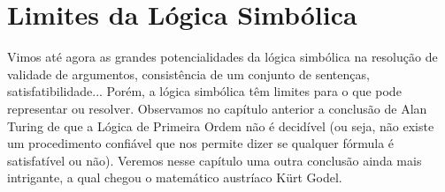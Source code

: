 \chapter{Limites da Lógica Simbólica}

Vimos até agora as grandes potencialidades da lógica simbólica na resolução de validade de argumentos, consistência de um conjunto de sentenças, satisfatibilidade... Porém, a lógica simbólica têm limites para o que pode representar ou resolver. Observamos no capítulo anterior a conclusão de Alan Turing de que a Lógica de Primeira Ordem não é decidível (ou seja, não existe um procedimento confiável que nos permite dizer se qualquer fórmula é satisfatível ou não). Veremos nesse capítulo uma outra conclusão ainda mais intrigante, a qual chegou o matemático austríaco Kürt Godel.